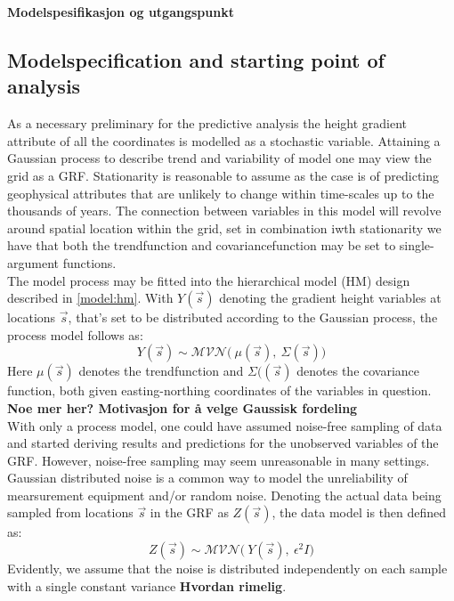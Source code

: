 \documentclass{report}
\begin{document}
\textbf{Modelspesifikasjon og utgangspunkt} \\
\subsection{Modelspecification and starting point of analysis} \label{subs:model}
As a necessary preliminary for the predictive analysis the height gradient attribute of all the coordinates is modelled as a stochastic variable. Attaining a Gaussian process to describe trend and variability of model one may view the grid as a GRF. Stationarity is reasonable to assume as the case is of predicting geophysical attributes that are unlikely to change within time-scales up to the thousands of years. The connection between variables in this model will revolve around spatial location within the grid, set in combination iwth stationarity we have that both the trendfunction and covariancefunction may be set to single-argument functions. \\
The model process may be fitted into the hierarchical model (HM) design described in \ref{model:hm}. With $Y(\vec{s})$ denoting the gradient height variables at locations $\vec{s}$, that's set to be distributed according to the Gaussian process, the process model follows as:
\begin{equation}
Y(\vec{s}) \sim \mathcal{MVN} \big( \ \mu(\vec{s}), \ \Sigma (\vec{s}) \big) 
\end{equation}
Here $\mu(\vec{s})$ denotes the trendfunction and $\Sigma((\vec{s})$ denotes the covariance function, both given easting-northing coordinates of the variables in question. \textbf{Noe mer her? Motivasjon for å velge Gaussisk fordeling} \\

With only a process model, one could have assumed noise-free sampling of data and started deriving results and predictions for the unobserved variables of the GRF. However, noise-free sampling may seem unreasonable in many settings. Gaussian distributed noise is a common way to model the unreliability of mearsurement equipment and/or random noise. Denoting the actual data being sampled from locations $\vec{s}$ in the GRF as $Z(\vec{s})$, the data model is then defined as:
\begin{equation}
Z(\vec{s}) \sim \mathcal{MVN} \big( \ Y(\vec{s}), \ \epsilon^2 I \big)
\end{equation}
Evidently, we assume that the noise is distributed independently on each sample with a single constant variance \textbf{Hvordan rimelig}. \\ 
\end{document}
